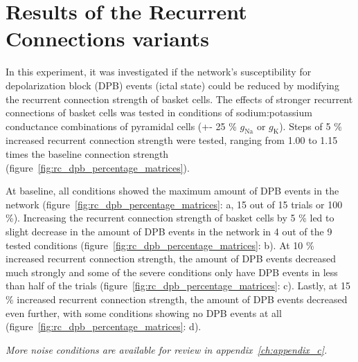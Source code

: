\section{Results of the Recurrent Connections variants}
In this experiment, it was investigated if the network's susceptibility for depolarization block (DPB) events (ictal state) could be reduced by modifying the recurrent connection strength of basket cells.
The effects of stronger recurrent connections of basket cells was tested in conditions of sodium:potassium conductance combinations of pyramidal cells (+- 25 \% \(g_{\text{Na}}\) or \(g_{\text{K}}\)).
Steps of 5 \% increased recurrent connection strength were tested, ranging from 1.00 to 1.15 times the baseline connection strength (figure~\ref{fig:rc_dpb_percentage_matrices}).

At baseline, all conditions showed the maximum amount of DPB events in the network (figure~\ref{fig:rc_dpb_percentage_matrices}: a, 15 out of 15 trials or 100 \%).
Increasing the recurrent connection strength of basket cells by 5 \% led to slight decrease in the amount of DPB events in the network in 4 out of the 9 tested conditions (figure~\ref{fig:rc_dpb_percentage_matrices}: b).
At 10 \% increased recurrent connection strength, the amount of DPB events decreased much strongly and some of the severe conditions only have DPB events in less than half of the trials (figure~\ref{fig:rc_dpb_percentage_matrices}: c).
Lastly, at 15 \% increased recurrent connection strength, the amount of DPB events decreased even further, with some conditions showing no DPB events at all (figure~\ref{fig:rc_dpb_percentage_matrices}: d).


\noindent
\textit{More noise conditions are available for review in appendix~\ref{ch:appendix_c}.}

